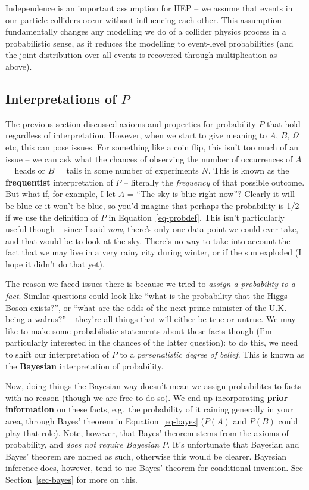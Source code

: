 \documentclass[
  11pt,
  numbers=noendperiod]{book}
\begin{document}
Independence is an important assumption for HEP -- we assume that events
in our particle colliders occur without influencing each other. This
assumption fundamentally changes any modelling we do of a collider
physics process in a probabilistic sense, as it reduces the modelling to
event-level probabilities (and the joint distribution over all events is
recovered through multiplication as above).

\hypertarget{interpretations-of-p}{%
\subsection{\texorpdfstring{Interpretations of
\(P\)}{Interpretations of P}}\label{interpretations-of-p}}

The previous section discussed axioms and properties for probability
\(P\) that hold regardless of interpretation. However, when we start to
give meaning to \(A\), \(B\), \(\Omega\) etc, this can pose issues. For
something like a coin flip, this isn't too much of an issue -- we can
ask what the chances of observing the number of occurrences of \(A\) =
heads or \(B\) = tails in some number of experiments \(N\). This is
known as the \textbf{frequentist} interpretation of \(P\) -- literally
the \emph{frequency} of that possible outcome. But what if, for example,
I let \(A\) = ``The sky is blue right now''? Clearly it will be blue or
it won't be blue, so you'd imagine that perhaps the probability is 1/2
if we use the definition of \(P\) in Equation~\ref{eq-probdef}. This
isn't particularly useful though -- since I said \emph{now}, there's
only one data point we could ever take, and that would be to look at the
sky. There's no way to take into account the fact that we may live in a
very rainy city during winter, or if the sun exploded (I hope it didn't
do that yet).

The reason we faced issues there is because we tried to \emph{assign a
probability to a fact}. Similar questions could look like ``what is the
probability that the Higgs Boson exists?'', or ``what are the odds of
the next prime minister of the U.K. being a walrus?'' -- they're all
things that will either be true or untrue. We may like to make some
probabilistic statements about these facts though (I'm particularly
interested in the chances of the latter question): to do this, we need
to shift our interpretation of \(P\) to a \emph{personalistic degree of
belief}. This is known as the \textbf{Bayesian} interpretation of
probability.

Now, doing things the Bayesian way doesn't mean we assign probabilites
to facts with no reason (though we are free to do so). We end up
incorporating \textbf{prior information} on these facts, e.g.~the
probability of it raining generally in your area, through Bayes' theorem
in Equation~\ref{eq-bayes} (\(P(A)\) and \(P(B)\) could play that role).
Note, however, that Bayes' theorem stems from the axioms of probability,
and \emph{does not require Bayesian \(P\)}. It's unfortunate that
Bayesian and Bayes' theorem are named as such, otherwise this would be
clearer. Bayesian inference does, however, tend to use Bayes' theorem
for conditional inversion. See Section~\ref{sec-bayes} for more on this.
\end{document}
